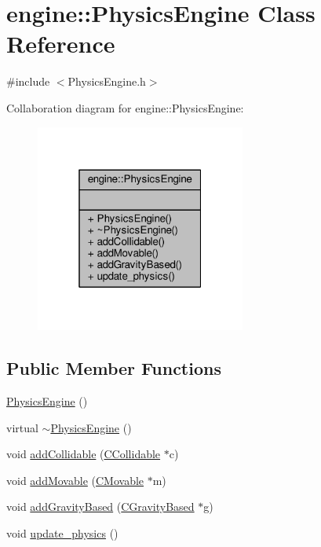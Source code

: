 \hypertarget{classengine_1_1PhysicsEngine}{\section{engine\-:\-:Physics\-Engine Class Reference}
\label{classengine_1_1PhysicsEngine}
}


{\ttfamily \#include $<$Physics\-Engine.\-h$>$}



Collaboration diagram for engine\-:\-:Physics\-Engine\-:\nopagebreak
\begin{figure}[H]
\begin{center}
\leavevmode
\includegraphics[width=196pt]{classengine_1_1PhysicsEngine__coll__graph}
\end{center}
\end{figure}
\subsection*{Public Member Functions}
\begin{DoxyCompactItemize}
\item 
\hyperlink{classengine_1_1PhysicsEngine_a14c98b9b2eae12bff267b99df27ac9fc}{Physics\-Engine} ()
\item 
virtual \hyperlink{classengine_1_1PhysicsEngine_a7b708ba5517fdd9cc95c977dde7ff4ab}{$\sim$\-Physics\-Engine} ()
\item 
void \hyperlink{classengine_1_1PhysicsEngine_a609b1b5b818d7865c9b20abfe07e26e8}{add\-Collidable} (\hyperlink{classengine_1_1CCollidable}{C\-Collidable} $\ast$c)
\item 
void \hyperlink{classengine_1_1PhysicsEngine_a32690f48a5df0b98c5f326c0b11414ba}{add\-Movable} (\hyperlink{classengine_1_1CMovable}{C\-Movable} $\ast$m)
\item 
void \hyperlink{classengine_1_1PhysicsEngine_a9bad0bea60bde295662e6768ac08e2a9}{add\-Gravity\-Based} (\hyperlink{classengine_1_1CGravityBased}{C\-Gravity\-Based} $\ast$g)
\item 
void \hyperlink{classengine_1_1PhysicsEngine_a3322f58beb2412c256cec11ae96b4957}{update\-\_\-physics} ()
\end{DoxyCompactItemize}


